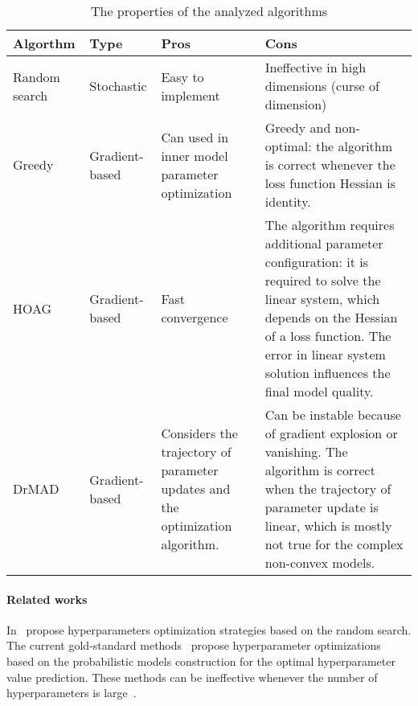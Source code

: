 \documentclass[12pt]{article}
\begin{document}
\begin{table}
\footnotesize

\begin{tabularx}{\textwidth}{|p{2cm}|p{2cm}|X|X|}
\hline
\bf Algorthm & \bf Type  & \bf Pros & \bf Cons  \\ \hline
Random search & Stochastic & Easy to implement & Ineffective in high dimensions (curse of dimension)\\ \hline
Greedy~\cite{hyper_greed} & Gradient-based & Can used in inner model parameter optimization& Greedy and non-optimal: the algorithm is correct whenever the loss function Hessian is identity. \\ \hline
HOAG~\cite{hyper_hoag} & Gradient-based & Fast convergence & The algorithm requires additional parameter configuration: it is required to solve the linear system, which depends on the Hessian of a loss function. The error in linear system solution influences the final model quality.\\ \hline 
DrMAD~\cite{hyper_mad} & Gradient-based & Considers the trajectory of parameter updates and the optimization algorithm.& Can be instable because of gradient explosion or vanishing. The algorithm is correct when the trajectory of parameter update is linear, which is mostly not true for the complex non-convex models. \\ \hline
\end{tabularx}

\caption{The properties of the analyzed algorithms}
\label{table:algo_descr}

\end{table}


\paragraph{Related works}
In~\cite{random1, random2} propose hyperparameters optimization strategies based on the random search. The current gold-standard methods~\cite{probopt1, probopt2}   propose hyperparameter optimizations based on the probabilistic models construction for the optimal hyperparameter value prediction. These methods can be ineffective whenever the number of hyperparameters is large~\cite{hyper}.
\end{document}
